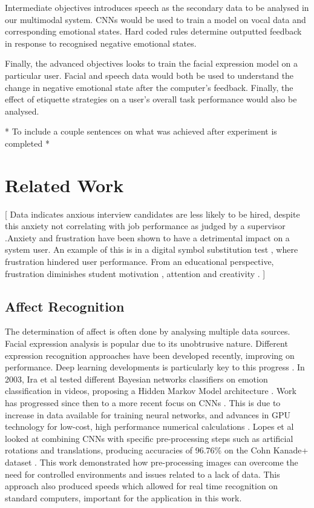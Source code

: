 \documentclass[12pt,a4paper]{article}
\begin{document}
Intermediate objectives introduces speech as the secondary data to be analysed in our multimodal system. CNNs would be used to train a model on vocal data and corresponding emotional states. Hard coded rules determine outputted feedback in response to recognised negative emotional states. 

Finally, the advanced objectives looks to train the facial expression model on a particular user. Facial and speech data would both be used to understand the change in negative emotional state after the computer's feedback. Finally, the effect of etiquette strategies on a user's overall task performance would also be analysed.

* To include a couple sentences on what was achieved after experiment is completed *



\section{Related Work}
[ Data indicates anxious interview candidates are less likely to be hired, despite this anxiety not correlating with job performance as judged by a supervisor \cite{schneider2019does}.Anxiety and frustration have been shown to have a detrimental impact on a system user. An example of this is in a digital symbol substitution test \cite{burgess1964effects}, where frustration hindered user performance. From an educational perspective, frustration diminishes student motivation \cite{weiner1985attributional}, attention \cite{niedenthal1994emotional} and creativity \cite{isen1987positive}. ]
\subsection{Affect Recognition}
The determination of affect is often done by analysing multiple data sources. Facial expression analysis is popular due to its unobtrusive nature. Different expression recognition approaches have been developed recently, improving on performance. Deep learning developments is particularly key to this progress \cite{voulodimos2018deep}. In 2003, Ira et al tested different Bayesian networks classifiers on emotion classification in videos, proposing a Hidden Markov Model architecture \cite{cohen2003evaluation}. Work has progressed since then to a more recent focus on CNNs \cite{cohen2003learning}. This is due to increase in data available for training neural networks, and advances in GPU technology for low-cost, high performance numerical calculations \cite{LOPES2017610}. Lopes et al looked at combining CNNs with specific pre-processing steps such as artificial rotations and translations, producing accuracies of 96.76\% on the Cohn Kanade+ dataset \cite{lucey2010extended}. This work demonstrated how pre-processing images can overcome the need for controlled environments and issues related to a lack of data. This approach also produced speeds which allowed for real time recognition on standard computers, important for the application in this work.
\end{document}
